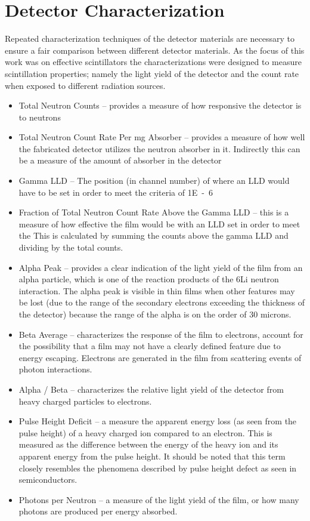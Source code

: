 \chapter{Detector Characterization}
\label{chap:DetChar}
Repeated characterization techniques of the detector materials are necessary to ensure a fair comparison between different detector materials.
As the focus of this work was on effective scintillators the characterizations were designed to measure scintillation properties; namely the light yield of the detector and the count rate when exposed to different radiation sources.

\begin{itemize}
  \item Total Neutron Counts – provides a measure of how responsive the detector is to neutrons
  \item  Total Neutron Count Rate Per mg Absorber – provides a measure of how well the fabricated detector utilizes the neutron absorber in it. Indirectly this can be a measure of the amount of absorber in the detector
  \item  Gamma LLD – The position (in channel number) of where an LLD would have to be set in order to meet the criteria of \si{1E-6}
  \item  Fraction of Total Neutron Count Rate Above the Gamma LLD – this is a measure of how effective the film would be with an LLD set in order to meet the This is calculated by summing the counts above the gamma LLD and dividing by the total counts.
  \item  Alpha Peak – provides a clear indication of the light yield of the film from an alpha particle, which is one of the reaction products of the 6Li neutron interaction. The alpha peak is visible in thin films when other features may be lost (due to the range of the secondary electrons exceeding the thickness of the detector) because the range of the alpha is on the order of 30 microns.
  \item  Beta Average – characterizes the response of the film to electrons, account for the possibility that a film may not have a clearly defined feature due to energy escaping. Electrons are generated in the film from scattering events of photon interactions.
  \item  Alpha / Beta – characterizes the relative light yield of the detector from heavy charged particles to electrons.
  \item  Pulse Height Deficit – a measure the apparent energy loss (as seen from the pulse height) of a heavy charged ion compared to an electron. This is measured as the difference between the energy of the heavy ion and its apparent energy from the pulse height. It should be noted that this term closely resembles the phenomena described by pulse height defect as seen in semiconductors.
  \item  Photons per Neutron – a measure of the light yield of the film, or how many photons are produced per energy absorbed.
\end{itemize}

